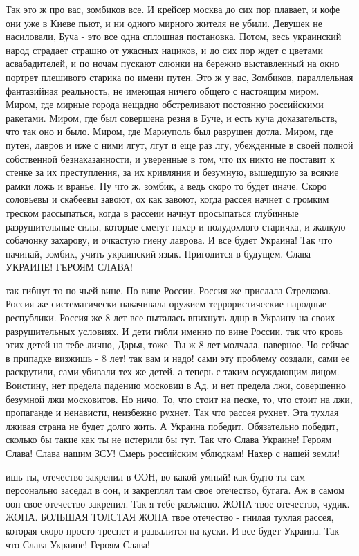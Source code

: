 Так это ж про вас, зомбиков все. И крейсер москва до сих пор плавает, и кофе
они уже в Киеве пьют, и ни одного мирного жителя не убили. Девушек не
насиловали, Буча - это все одна сплошная постановка. Потом, весь украинский
народ страдает страшно от ужасных нациков, и до сих пор ждет с цветами
асвабадителей, и по ночам пускают слюнки на бережно выставленный на окно
портрет плешивого старика по имени путен. Это ж у вас, Зомбиков, параллельная
фантазийная реальность, не имеющая ничего общего с настоящим миром. Миром, где
мирные города нещадно обстреливают постоянно российскими ракетами. Миром, где
был совершена резня в Буче, и есть куча доказательств, что так оно и было.
Миром, где Мариуполь был разрушен дотла. Миром, где путен, лавров и иже с ними
лгут, лгут и еще раз лгу, убежденные в своей полной собственной
безнаказанности, и уверенные в том, что их никто не поставит к стенке за их
преступления, за их кривляния и безумную, вышедшую за всякие рамки ложь и
вранье. Ну что ж. зомбик, а ведь скоро то будет иначе. Скоро соловьевы и
скабеевы завоют, ох как завоют, когда рассея начнет с громким треском
рассыпаться, когда в рассеии начнут просыпаться глубинные разрушительные силы,
которые сметут нахер и полудохлого старичка, и жалкую собачонку захарову, и
очкастую гиену лаврова. И все будет Украина! Так что начинай, зомбик, учить
украинский язык. Пригодится в будущем. Слава УКРАИНЕ! ГЕРОЯМ СЛАВА!

так гибнут то по чьей вине. По вине России. Россия же прислала Стрелкова.
Россия же систематически накачивала оружием террористические народные
республики. Россия же 8 лет все пыталась впихнуть лднр в Украину на своих
разрушительных условиях. И дети гибли именно по вине России, так что кровь этих
детей на тебе лично, Дарья, тоже. Ты ж 8 лет молчала, наверное. Чо сейчас в
припадке визжишь - 8 лет! так вам и надо! сами эту проблему создали, сами ее
раскрутили, сами убивали тех же детей, а теперь с таким осуждающим лицом.
Воистину, нет предела падению московии в Ад, и нет предела лжи, совершенно
безумной лжи московитов. Но ничо. То, что стоит на песке, то, что стоит на лжи,
пропаганде и ненависти, неизбежно рухнет. Так что рассея рухнет. Эта тухлая
лживая страна не будет долго жить. А Украина победит. Обязательно победит,
сколько бы такие как ты не истерили бы тут. Так что Слава Украине! Героям
Слава! Слава нашим ЗСУ! Смерь российским ублюдкам! Нахер с нашей земли!

ишь ты, отечество закрепил в ООН, во какой умный! как будто ты сам персонально
заседал в оон, и закреплял там свое отечество, бугага. Аж в самом оон свое
отечество закрепил. Так я тебе разъясню. ЖОПА твое отечество, чудик. ЖОПА.
БОЛЬШАЯ ТОЛСТАЯ ЖОПА твое отечество - гнилая тухлая рассея, которая скоро
просто треснет и развалится на куски. И все будет Украина. Так что Слава
Украине! Героям Слава!

